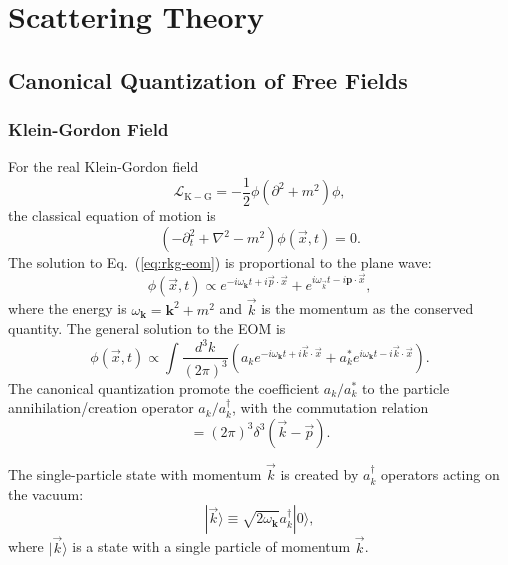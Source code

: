 \chapter{Scattering Theory}

\section{Canonical Quantization of Free Fields}
\subsection{Klein-Gordon Field}
For the real Klein-Gordon field
\begin{equation*}
	\mathcal L_{\mathrm{K-G}} = -\frac{1}{2}\phi (\partial^2+m^2) \phi,
\end{equation*}
the classical equation of motion is 
\begin{equation}
	(-\partial_t^2+\nabla^2-m^2)\phi(\vec x,t) = 0. 
	\label{eq:rkg-eom}
\end{equation}
The solution to Eq.~(\ref{eq:rkg-eom}) is proportional to the plane wave:
\begin{equation*}
	\phi(\vec x, t) \propto e^{-i\omega_{\bm{k}}t+i\vec{p}\cdot\vec{x}} + e^{i\omega_{\vec{k}}t-i\bm{p}\cdot\vec{x}},
\end{equation*}
where the energy is $\omega_{\bm{k}}=\bm{k}^2+m^2$ and $\vec k$ is the momentum as the conserved quantity.
The general solution to the EOM is
\begin{equation}
	\phi(\vec x,t) \propto \int \frac{d^{3} k}{(2\pi)^{3}} \left(
		a_{k}e^{-i\omega_{\bm{k}}t+i\vec{k}\cdot\vec{x}} + 
		a^*_{k}e^{i\omega_{\bm{k}}t-i\vec{k}\cdot\vec{x}} 
	\right).
\end{equation}
The canonical quantization promote the coefficient $a_{k}/a_{k}^*$ to the particle annihilation/creation operator $a_{k}/a_{k}^\dagger$, with the commutation relation
\begin{equation}
	[a_{k}, a_{p}^\dagger] = (2\pi)^{3} \delta^{3}(\vec{k}-\vec{p}).
\end{equation}

The single-particle state with momentum $\vec k$ is created by $a_{k}^{\dagger}$ operators acting on the vacuum:
\begin{equation}
	|\vec{k}\rangle \equiv \sqrt{2\omega_{\bm k}} a_{k}^{\dagger}|0\rangle,
	\label{eq:rel-single-particle}
\end{equation}
where $|\vec{k}\rangle$ is a state with a single particle of momentum $\vec{k}$.

